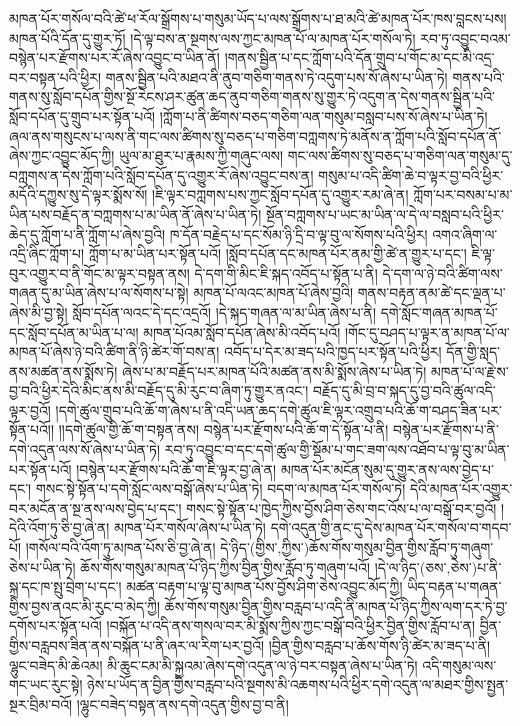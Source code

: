 མཁན་པོར་གསོལ་བའི་ཚེ་ཕ་རོལ་སྒྲོགས་པ་གསུམ་ཡོད་པ་ལས་སྒྲོགས་པ་ཐ་མའི་ཚེ་མཁན་པོར་ཁས་བླངས་པས། མཁན་པོའི་དོན་དུ་གྱུར་ཏོ། །དེ་ལྟ་བས་ན་སྔགས་ལས་ཀྱང་མཁན་པོ་ལ་མཁན་པོར་གསོལ་ཏེ། རབ་ཏུ་འབྱུང་བའམ་བསྙེན་པར་རྫོགས་པར་རོ་ཞེས་འབྱུང་བ་ཡིན་ནོ། །གནས་སྦྱིན་པ་དང་ཀློག་པའི་དོན་གྲུབ་པ་གོང་མ་དང་མི་འདྲ་བར་བསྟན་པའི་ཕྱིར། གནས་སྦྱིན་པའི་མཐའ་ནི་ནུབ་གཅིག་གནས་ཏེ་འདུག་པས་སོ་ཞེས་པ་ཡིན་ཏེ། གནས་པའི་གནས་སུ་སློབ་དཔོན་གྱིས་སྔོ་རེངས་ཤར་ཚུན་ཆད་ནུབ་གཅིག་གནས་སུ་གྱུར་ཏེ་འདུག་ན་དེས་གནས་སྦྱིན་པའི་སློབ་དཔོན་དུ་གྲུབ་པར་སྟོན་པའོ། །ཀློག་པ་ནི་ཚིགས་བཅད་གཅིག་ལན་གསུམ་བསླབ་པས་སོ་ཞེས་པ་ཡིན་ཏེ། ཞལ་ནས་གསུངས་པ་ལས་ནི་གང་ལས་ཚིགས་སུ་བཅད་པ་གཅིག་བཀླགས་ཏེ་མནོས་ན་ཀློག་པའི་སློབ་དཔོན་ནོ་ཞེས་ཀྱང་འབྱུང་མོད་ཀྱི། ཡུལ་མ་ཐུར་པ་རྣམས་ཀྱི་གཞུང་ལས། གང་ལས་ཚིགས་སུ་བཅད་པ་གཅིག་ལན་གསུམ་དུ་བཀླགས་ན་དེས་ཀློག་པའི་སློབ་དཔོན་དུ་འགྱུར་རོ་ཞེས་འབྱུང་བས་ན། གསུམ་པ་འདི་ཚིག་ཆེ་བ་ལྟར་བྱ་བའི་ཕྱིར་མདོའི་དཀྱུས་སུ་དེ་ལྟར་སྨོས་སོ། །ཇི་ལྟར་བཀླགས་པས་ཀྱང་སློབ་དཔོན་དུ་འགྱུར་རམ་ཞེ་ན། ཀློག་པར་བསམ་པ་མ་ཡིན་པས་བརྗོད་ན་བཀླགས་པ་མ་ཡིན་ནོ་ཞེས་པ་ཡིན་ཏེ། སྔོན་བཀླགས་པ་ཡང་མ་ཡིན་ལ་དེ་ལ་བསླབ་པའི་ཕྱིར་ཆེད་དུ་ཀློག་པ་ནི་ཀློག་པ་ཞེས་བྱའི། ཁ་དོན་བརྗེད་པ་དང་སོམ་ཉི་དྲི་བ་ལྟ་བུ་ལ་སོགས་པའི་ཕྱིར། འགའ་ཞིག་ལ་འདྲི་ཞིང་ཀློག་པ། ཀློག་པ་མ་ཡིན་པར་སྟོན་པའོ། །སློབ་དཔོན་དང་མཁན་པོར་ནམ་གྱི་ཚེ་ན་གྱུར་པ་དང་། ཇི་ལྟ་བུར་འགྱུར་བ་ནི་གོང་མ་ལྟར་བསྟན་ནས། དེ་དག་གི་མིང་ཇི་སྐད་འབོད་པ་སྟོན་པ་ནི། དེ་དག་ལ་ཉེ་བའི་ཚིག་ལས་གཞན་དུ་མ་ཡིན་ཞེས་པ་ལ་སོགས་པ་སྟེ། མཁན་པོ་ལའང་མཁན་པོ་ཞེས་བྱའི། གནས་བརྟན་ནམ་ཚེ་དང་ལྡན་པ་ཞེས་མི་བྱ་སྟེ། སློབ་དཔོན་ལའང་དེ་དང་འདྲའོ། །དེ་སྐད་གཞན་ལ་མ་ཡིན་ཞེས་པ་ནི། དགེ་སློང་གཞན་མཁན་པོ་དང་སློབ་དཔོན་མ་ཡིན་པ་ལ། མཁན་པོའམ་སློབ་དཔོན་ཞེས་མི་འབོད་པའོ། །གོང་དུ་བཤད་པ་ལྟར་ན་མཁན་པོ་ལ་མཁན་པོ་ཞེས་ཉེ་བའི་ཚིག་ནི་ཉི་ཚེར་གོ་བས་ན། འབོད་པ་དེར་མ་ཟད་པའི་ཁྱད་པར་སྟོན་པའི་ཕྱིར། དོན་གྱི་སླད་ནས་མཚན་ནས་སྨོས་ཏེ། ཞེས་པ་མ་བརྗོད་པར་མཁན་པོའི་མཚན་ནས་མི་སྨོས་ཞེས་པ་ཡིན་ཏེ། མཁན་པོ་ལ་རྗེ་ས་བྱ་བའི་ཕྱིར་དེའི་མིང་ནས་མི་བརྗོད་དུ་མི་རུང་བ་ཞིག་ཏུ་གྱུར་ནའང་། བརྗོད་དུ་མི་བྲ་བ་སྐད་དུ་བྱ་བའི་ཚུལ་འདི་ལྟར་བྱའོ། །དགེ་ཚུལ་གྲུབ་པའི་ཆོ་ག་ཞེས་པ་ནི་འདི་ཡན་ཆད་དགེ་ཚུལ་ཇི་ལྟར་འགྲུབ་པའི་ཆོ་ག་བཤད་ཟིན་པར་སྟོན་པའོ།། །།དགེ་ཚུལ་གྱི་ཆོ་ག་བསྟན་ནས། བསྙེན་པར་རྫོགས་པའི་ཆོ་ག་དེ་སྟོན་པ་ནི། བསྙེན་པར་རྫོགས་པ་ནི་དགེ་འདུན་ལས་སོ་ཞེས་པ་ཡིན་ཏེ། རབ་ཏུ་འབྱུང་བ་དང་དགེ་ཚུལ་གྱི་སྡོམ་པ་གང་ཟག་ལས་འཐོབ་པ་ལྟ་བུ་མ་ཡིན་པར་སྟོན་པའོ། །བསྙེན་པར་རྫོགས་པའི་ཆོ་ག་ཇི་ལྟར་བྱ་ཞེ་ན། མཁན་པོར་མངོན་སུམ་དུ་གྱུར་ནས་ལས་བྱེད་པ་དང་། གསང་སྟེ་སྟོན་པ་དགེ་སློང་ལས་བསྒོ་ཞེས་པ་ཡིན་ཏེ། བདག་ལ་མཁན་པོར་གསོལ་ཏེ། དེའི་མཁན་པོར་འགྱུར་བར་མངོན་ན་སྔ་ནས་ལས་བྱེད་པ་དང་། གསང་སྟེ་སྟོན་པ་ཁྱེད་ཀྱིས་བྱོས་ཤིག་ཅེས་གང་འོས་པ་ལ་བསྒོ་བར་བྱའོ། །དེའི་འོག་ཏུ་ཅི་བྱ་ཞེ་ན། མཁན་པོར་གསོལ་ཞེས་པ་ཡིན་ཏེ། དགེ་འདུན་གྱི་ནང་དུ་དེས་མཁན་པོར་གསོལ་བ་གདབ་པོ། །གསོལ་བའི་འོག་ཏུ་མཁན་པོས་ཅི་བྱ་ཞེ་ན། དེ་ཉིད་(གྱིས་‚ཀྱིས་)ཆོས་གོས་གསུམ་བྱིན་གྱིས་རློབ་ཏུ་གཞུག་ཅེས་པ་ཡིན་ཏེ། ཆོས་གོས་གསུམ་མཁན་པོ་ཉིད་ཀྱིས་བྱིན་གྱིས་རློབ་ཏུ་གཞུག་པའོ། །དེ་ལ་ཉིད་(ཅས་‚ཅེས་)པ་ནི་སྐྲ་དང་ཁ་སྤུ་བྲེག་པ་དང་། མཚན་བརྟག་པ་ལྟ་བུ་མཁན་པོས་བྱོས་ཤིག་ཅེས་འབྱུང་མོད་ཀྱི། ཡིད་བརྟན་པ་གཞན་གྱིས་བྱས་ནའང་མི་རུང་བ་མེད་ཀྱི། ཆོས་གོས་གསུམ་བྱིན་གྱིས་བརླབ་པ་འདི་ནི་མཁན་པོ་ཉིད་ཀྱིས་ལག་དར་ཏེ་བྱ་དགོས་པར་སྟོན་པའོ། །བསྐོན་པ་འདི་ནས་གསལ་བར་མི་སྨོས་ཀྱིས་ཀྱང་བསྒོ་བའི་ཕྱིར་བྱིན་གྱིས་རློབ་པ་ན། བྱིན་གྱིས་བརླབས་ཟིན་ནས་བསྐོན་པ་ནི་ཞར་ལ་རིག་པར་བྱའོ། །བྱིན་གྱིས་བརླབ་པ་ཆོས་གོས་ཉི་ཚེར་མ་ཟད་པ་ནི། ལྷུང་བཟེད་མི་ཆེའམ། མི་ཆུང་ངམ་མི་སྐྱའམ་ཞེས་དགེ་འདུན་ལ་ཉེ་བར་བསྟན་ཞེས་པ་ཡིན་ཏེ། འདི་གསུམ་ལས་གང་ཡང་རུང་སྟེ། ཉེས་པ་ཡོད་ན་བྱིན་གྱིས་བརླབ་པའི་སྔགས་མི་འཆགས་པའི་ཕྱིར་དགེ་འདུན་ལ་མཐར་གྱིས་སྤྱན་སྔར་བྲིམ་བའོ། །ལྷུང་བཟེད་བསྟན་ནས་དགེ་འདུན་གྱིས་བྱ་བ་ནི། 